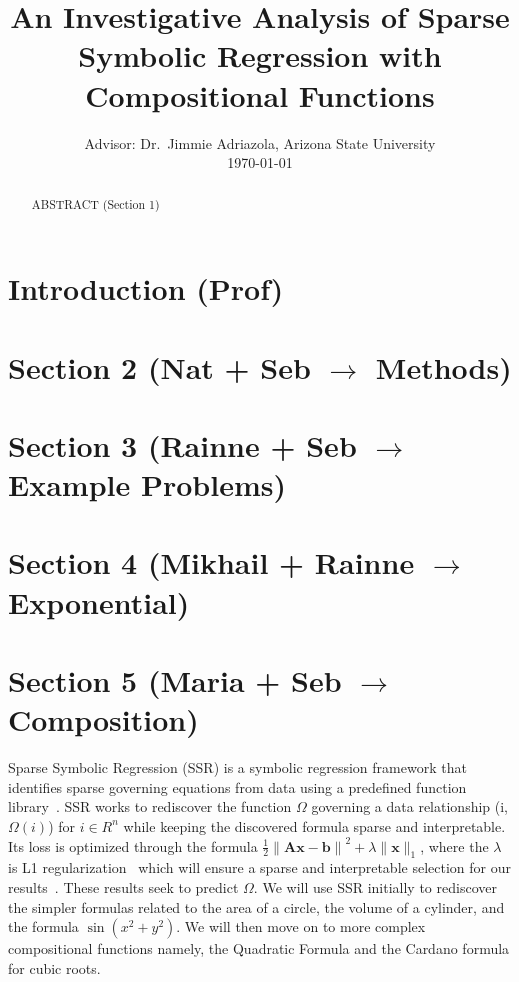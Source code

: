 \documentclass[11pt]{article}
\title{An Investigative Analysis of Sparse Symbolic Regression with Compositional Functions}
\author{}
\date{\small Advisor: Dr.\ Jimmie Adriazola, Arizona State University\\[4pt] \today}
\theoremstyle{plain}
\theoremstyle{definition}
\begin{document}
\maketitle
 
\begin{abstract}

ABSTRACT (Section 1)

\end{abstract}

\section{Introduction (Prof)}\label{sec:introduction}

\section{Section 2 (Nat + Seb $\rightarrow$ Methods)}\label{sec:quadratic}

\section{Section 3 (Rainne + Seb $\rightarrow$ Example Problems)}\label{sec:introduction}

\section{Section 4 (Mikhail + Rainne $\rightarrow$ Exponential)}\label{sec:quadratic}

\section{Section 5 (Maria + Seb $\rightarrow$ Composition)}\label{sec:introduction}
Sparse Symbolic Regression (SSR) is a symbolic regression framework that identifies sparse governing equations from data using a predefined function library~\cite{brunton2016sindy}. SSR works to rediscover the function $\Omega$ governing a data relationship (i, $\Omega(i)$) for $i \in R^n$ while keeping the discovered formula sparse and interpretable. Its loss is optimized through the formula $\frac{1}{2}{\lVert \mathbf{A} \mathbf{x} - \mathbf{b}\rVert}^2 + \lambda {\lVert\mathbf{x}\rVert_1}$, where the $\lambda$ is L1 regularization~\cite{tibshirani1996lasso} which will ensure a sparse and interpretable selection for our results~\cite{beck2009fista}. These results seek to predict $\Omega$. We will use SSR initially to rediscover the simpler formulas related to the area of a circle, the volume of a cylinder, and the formula $\sin(x^2+y^2)$. We will then move on to more complex compositional functions namely, the Quadratic Formula and the Cardano formula for cubic roots.
\end{document}
